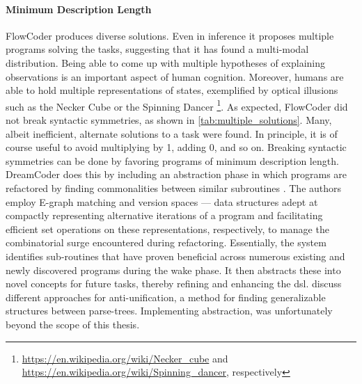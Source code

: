 \paragraph*{Minimum Description Length}\label{sec:MDL}
FlowCoder produces diverse solutions. Even in inference it proposes multiple programs solving the tasks, suggesting that it has found a multi-modal distribution. Being able to come up with multiple hypotheses of explaining observations is an important aspect of human cognition. Moreover, humans are able to hold multiple representations of states, exemplified by optical illusions such as the Necker Cube or the Spinning Dancer \footnote{\url{https://en.wikipedia.org/wiki/Necker_cube} and \url{https://en.wikipedia.org/wiki/Spinning_dancer}, respectively}. 
As expected, FlowCoder did not break syntactic symmetries, as shown in \autoref{tab:multiple_solutions}. Many, albeit inefficient, alternate solutions to a task were found. In principle, it is of course useful to avoid multiplying by 1, adding 0, and so on. Breaking syntactic symmetries can be done by favoring programs of minimum description length. DreamCoder does this by including an abstraction phase in which programs are refactored by finding commonalities between similar subroutines \cite{ellisDreamCoderBootstrappingInductive2021}. The authors employ E-graph matching and version spaces — data structures adept at compactly representing alternative iterations of a program and facilitating efficient set operations on these representations, respectively, to manage the combinatorial surge encountered during refactoring. Essentially, the system identifies sub-routines that have proven beneficial across numerous existing and newly discovered programs during the wake phase. It then abstracts these into novel concepts for future tasks, thereby refining and enhancing the \acrshort{dsl}.
\citet{cernaAntiunificationGeneralizationSurvey2023} discuss different approaches for anti-unification, a method for finding generalizable structures between parse-trees. Implementing abstraction, was unfortunately beyond the scope of this thesis.

